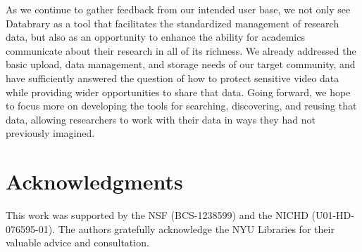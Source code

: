 \documentclass{sig-alternate}
\begin{document}
As we continue to gather feedback from our intended user base, we not only see Databrary as a tool that facilitates the standardized management of research data, but also as an opportunity to enhance the ability for academics communicate about their research in all of its richness. We already addressed the basic upload, data management, and storage needs of our target community, and have sufficiently answered the question of how to protect sensitive video data while providing wider opportunities to share that data. Going forward, we hope to focus more on developing the tools for searching, discovering, and reusing that data, allowing researchers to work with their data in ways they had not previously imagined.

\section*{Acknowledgments}

This work was supported by the NSF (BCS-1238599) and the NICHD (U01-HD-076595-01).
The authors gratefully acknowledge the NYU Libraries for their valuable advice and consultation.



\end{document}
